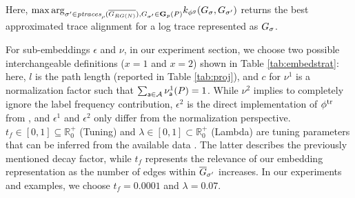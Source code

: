 {{%
Here, ${\max\arg}_{\nonlogtrace\in \WCal{\pmin}{n}, G_\nonlogtrace\in\TBf{p}{n}(P)} k_{\gorgembed}(G_\logtrace, G_{\nonlogtrace})$ returns the best approximated trace alignment for a log trace represented as $G_{\logtrace}$. %
%
\begin{table}[!t]
	\caption{Different sub-embedding definitions ($\epsilon^1$, $\epsilon^2$, $\nu^1$, and $\nu^2$) for $\gorgembed$.}\label{tab:embedstrat}
	\centering
\end{table}
%
For sub-embeddings $\epsilon$ and $\nu$, {in our experiment section}, we choose two possible interchangeable definitions ($x=1$ and $x=2$) shown in Table \ref{tab:embedstrat}: here, $l$ is the path length (reported in Table \ref{tab:proj}), and $c$ for $\nu^1$ is a normalization factor such that $\sum_{\const{a}\in\mathcal{A}}\nu^1_\const{a}(P)=1$. While $\nu^2$ implies to completely ignore the label frequency contribution, $\epsilon^2$ is the direct implementation of $\trembed$ from \cite{LodhiSSCW02}, and $\epsilon^1$ and $\epsilon^2$ only differ from the normalization perspective. %
%
$t_f\in [0,1]\subseteq\mathbb{R}^+_{0}$ (\textsf{Tuning}) and $\lambda\in [0,1]\subset\mathbb{R}^+_{0}$ (\textsf{Lambda}) are tuning parameters that can be
inferred from the available data \cite{DriessensRG06}. The latter describes the previously mentioned decay factor, while $t_f$
represents the relevance of our embedding representation as the number of edges within $\closed{G}_\nonlogtrace$ increases. In our experiments and
examples, we choose $t_f=0.0001$ and $\lambda=0.07$.



}}
